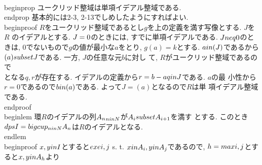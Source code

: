 \\begin{prop}
 ユークリッド整域は単項イデアル整域である.
\\end{prop}
基本的には2-3, 2-13でしめしたようにすればよい.
\\begin{proof}
 $R$をユークリッド整域であるとし$g$を上の定義を満す写像とする. $J$を$R$
 のイデアルとする. $J=\\{0\\}$のときには, すでに単項イデアルである. $J\\neq
 \\{0\\}$のときは, $0$でないもので$g$の値が最小な$a$をとり, $g(a)=k$とする.
 $a\\in (J)$であるから$(a)\\subset J$である. 一方, $J$の任意な元$b$に対し
 て, $R$がユークリッド整域であるので
 \\[
 b, a\\in R\\Rightarrow q, r\\in R\\text{で}b=aq+r(r=0\\text{また
 は}g(r)<g(b)). 
 \\]
 となる$q, r$が存在する. イデアルの定義から$r=b-aq\\in J$である. $a$の最
 小性から$r=0$であるので$b\\in (a)$である. よって$J=(a)$となるので$R$は単
 項イデアル整域である.
\\end{proof}
\\begin{lem}
 環$R$のイデアルの列$\\{A_{n}\\}_{n\\in \\N}$が$A_{i}\\subset A_{i+1}$を満す
 とする. このとき$\\dps I=\\bigcup_{n\\in \\N}A_{n}$は$R$のイデアルとなる.
\\end{lem}
\\begin{proof}
 $x, y\\in I$とすると$\\exe i, j$ s. t. $x\\in A_{i}, y\\in
 A_{j}$であるので, $h=\\max\\{i, j\\}$とすると$x, y\\in A_{h}$より
